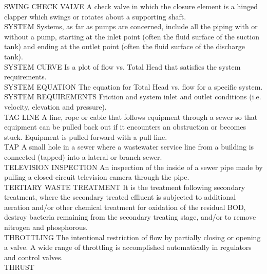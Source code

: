 SWING CHECK VALVE
A check valve in which the closure element is a hinged clapper which swings or rotates about a supporting shaft.
\vspace{0.3cm}\\
SYSTEM
Systems, as far as pumps are concerned, include all the piping with or without a pump, starting at the inlet point (often the fluid surface of the suction tank) and ending at the outlet point (often the fluid surface of the discharge tank).
\vspace{0.3cm}\\
SYSTEM CURVE
Is a plot of flow vs. Total Head that satisfies the system requirements.
\vspace{0.3cm}\\
SYSTEM EQUATION
The equation for Total Head vs. flow for a specific system.
\vspace{0.3cm}\\
SYSTEM REQUIREMENTS
Friction and system inlet and outlet conditions (i.e. velocity, elevation and pressure).
\vspace{0.3cm}\\
TAG LINE
A line, rope or cable that follows equipment through a sewer so that equipment can be pulled back out if it encounters an obstruction or becomes stuck. Equipment is pulled forward with a pull line. 
\vspace{0.3cm}\\
TAP
A small hole in a sewer where a wastewater service line from a building is connected (tapped) into a lateral or branch sewer. 
\vspace{0.3cm}\\
TELEVISION INSPECTION
An inspection of the inside of a sewer pipe made by pulling a closed-circuit television camera through the pipe. 
\vspace{0.3cm}\\
TERTIARY WASTE TREATMENT
It is the treatment following secondary treatment, where the secondary treated effluent is subjected to additional aeration and/or other chemical treatment for oxidation of the residual BOD, destroy bacteria remaining from the secondary treating stage, and/or to remove nitrogen and phosphorous. 
\vspace{0.3cm}\\
THROTTLING
The intentional restriction of flow by partially closing or opening a valve. A wide range of throttling is accomplished automatically in regulators and control valves.
\vspace{0.3cm}\\
THRUST
